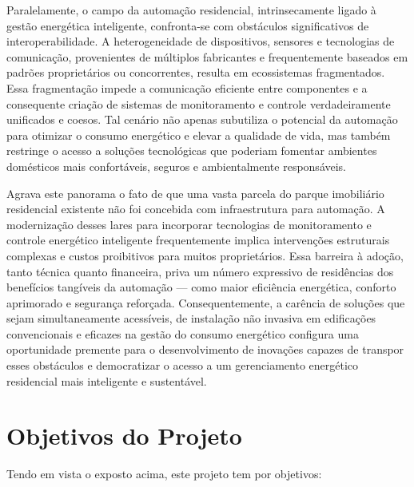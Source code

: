 Paralelamente, o campo da automação residencial, intrinsecamente ligado à gestão energética inteligente, confronta-se com obstáculos significativos de interoperabilidade. A heterogeneidade de dispositivos, sensores e tecnologias de comunicação, provenientes de múltiplos fabricantes e frequentemente baseados em padrões proprietários ou concorrentes, resulta em ecossistemas fragmentados. Essa fragmentação impede a comunicação eficiente entre componentes e a consequente criação de sistemas de monitoramento e controle verdadeiramente unificados e coesos. Tal cenário não apenas subutiliza o potencial da automação para otimizar o consumo energético e elevar a qualidade de vida, mas também restringe o acesso a soluções tecnológicas que poderiam fomentar ambientes domésticos mais confortáveis, seguros e ambientalmente responsáveis.

Agrava este panorama o fato de que uma vasta parcela do parque imobiliário residencial existente não foi concebida com infraestrutura para automação. A modernização desses lares para incorporar tecnologias de monitoramento e controle energético inteligente frequentemente implica intervenções estruturais complexas e custos proibitivos para muitos proprietários. Essa barreira à adoção, tanto técnica quanto financeira, priva um número expressivo de residências dos benefícios tangíveis da automação — como maior eficiência energética, conforto aprimorado e segurança reforçada. Consequentemente, a carência de soluções que sejam simultaneamente acessíveis, de instalação não invasiva em edificações convencionais e eficazes na gestão do consumo energético configura uma oportunidade premente para o desenvolvimento de inovações capazes de transpor esses obstáculos e democratizar o acesso a um gerenciamento energético residencial mais inteligente e sustentável.

\section{Objetivos do Projeto}
\label{sec:objetivos}

Tendo em vista o exposto acima, este projeto tem por objetivos:

